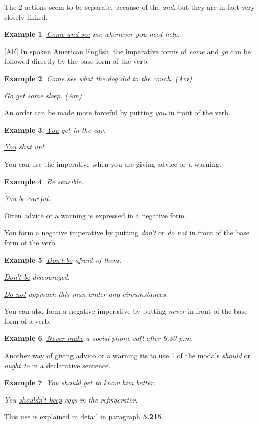 \documentclass[oneside]{book}
\numberwithin{equation}{section}
\newtheorem{example}{Example}[section]
\begin{document}
The 2 actions seem to be separate, because of the \textit{and}, but they are in fact very closely linked.
\begin{example}
    \underline{Come and see} me whenever you need help.
\end{example}
[AE] In spoken American English, the imperative forms of \textit{come} and \textit{go} can be followed directly by the base form of the verb.
\begin{example}
    \underline{Come see} what the dog did to the couch. (Am)
    
    \underline{Go get} some sleep. (Am)
\end{example}
An order can be made more forceful by putting \textit{you} in front of the verb.
\begin{example}
    \underline{You} get in the car.
    
    \underline{You} shut up!
\end{example}
%
\noindent{} You can use the imperative when you are giving advice or a warning.
\begin{example}
    \underline{Be} sensible.
    
    You \underline{be} careful.
\end{example}
Often advice or a warning is expressed in a negative form.

You form a negative imperative by putting \textit{don't} or \textit{do not} in front of the base form of the verb.
\begin{example}
    \underline{Don't be} afraid of them.
    
    \underline{Don't be} discouraged.
    
    \underline{Do not} approach this man under any circumstances.
\end{example}
You can also form a negative imperative by putting \textit{never} in front of the base form of a verb.
\begin{example}
    \underline{Never make} a social phone call after 9.30 p.m.
\end{example}
Another way of giving advice or a warning its to use 1 of the modals \textit{should} or \textit{ought to} in a declarative sentence.
\begin{example}
    You \underline{should get} to know him better.
    
    You \underline{shouldn't keep} eggs in the refrigerator.
\end{example}
This use is explained in detail in paragraph \textbf{5.215}.
\end{document}

